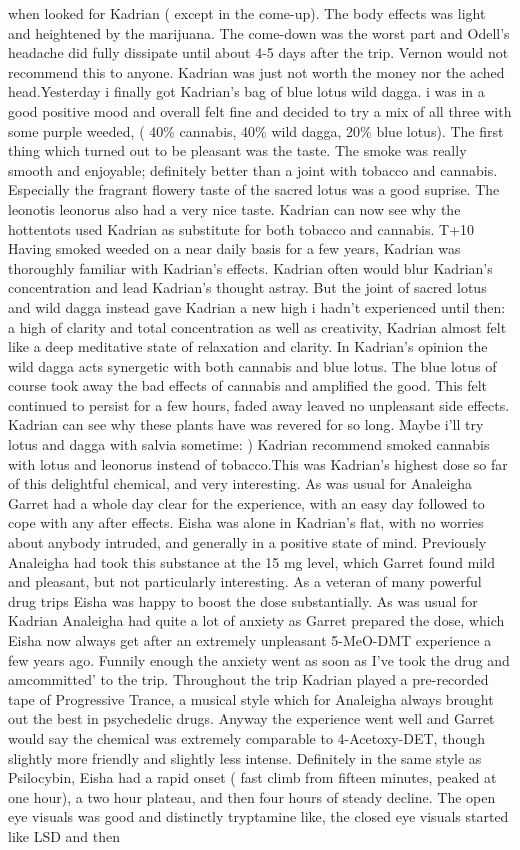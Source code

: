 \documentclass[12pt]{book}
\begin{document}
when looked for Kadrian ( except in the come-up). The body effects was light and heightened by the marijuana. The come-down was the worst part and Odell's headache did fully dissipate until about 4-5 days after the trip. Vernon would not recommend this to anyone. Kadrian was just not worth the money nor the ached head.Yesterday i finally got Kadrian's bag of blue lotus wild dagga. i was in a good positive mood and overall felt fine and decided to try a mix of all three with some purple weeded, ( 40\% cannabis, 40\% wild dagga, 20\% blue lotus). The first thing which turned out to be pleasant was the taste. The smoke was really smooth and enjoyable; definitely better than a joint with tobacco and cannabis. Especially the fragrant flowery taste of the sacred lotus was a good suprise. The leonotis leonorus also had a very nice taste. Kadrian can now see why the hottentots used Kadrian as substitute for both tobacco and cannabis. T+10 Having smoked weeded on a near daily basis for a few years, Kadrian was thoroughly familiar with Kadrian's effects. Kadrian often would blur Kadrian's concentration and lead Kadrian's thought astray. But the joint of sacred lotus and wild dagga instead gave Kadrian a new high i hadn't experienced until then: a high of clarity and total concentration as well as creativity, Kadrian almost felt like a deep meditative state of relaxation and clarity. In Kadrian's opinion the wild dagga acts synergetic with both cannabis and blue lotus. The blue lotus of course took away the bad effects of cannabis and amplified the good. This felt continued to persist for a few hours, faded away leaved no unpleasant side effects. Kadrian can see why these plants have was revered for so long. Maybe i'll try lotus and dagga with salvia sometime: ) Kadrian recommend smoked cannabis with lotus and leonorus instead of tobacco.This was Kadrian's highest dose so far of this delightful chemical, and very interesting. As was usual for Analeigha Garret had a whole day clear for the experience, with an easy day followed to cope with any after effects. Eisha was alone in Kadrian's flat, with no worries about anybody intruded, and generally in a positive state of mind. Previously Analeigha had took this substance at the 15 mg level, which Garret found mild and pleasant, but not particularly interesting. As a veteran of many powerful drug trips Eisha was happy to boost the dose substantially. As was usual for Kadrian Analeigha had quite a lot of anxiety as Garret prepared the dose, which Eisha now always get after an extremely unpleasant 5-MeO-DMT experience a few years ago. Funnily enough the anxiety went as soon as I've took the drug and amcommitted' to the trip. Throughout the trip Kadrian played a pre-recorded tape of Progressive Trance, a musical style which for Analeigha always brought out the best in psychedelic drugs. Anyway the experience went well and Garret would say the chemical was extremely comparable to 4-Acetoxy-DET, though slightly more friendly and slightly less intense. Definitely in the same style as Psilocybin, Eisha had a rapid onset ( fast climb from fifteen minutes, peaked at one hour), a two hour plateau, and then four hours of steady decline. The open eye visuals was good and distinctly tryptamine like, the closed eye visuals started like LSD and then 
\end{document}
